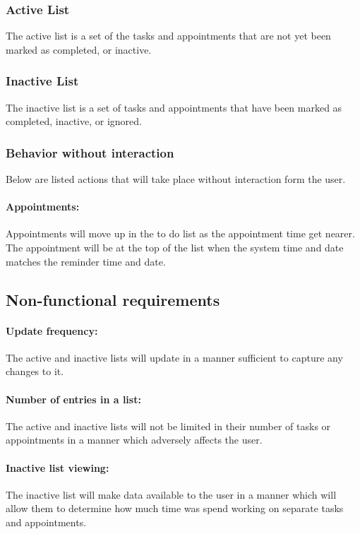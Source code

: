 \documentclass[12pt,a4paper]{article}
\begin{document}
\subsubsection{Active List}
The active list is a set of the tasks and appointments that are not yet been marked as completed, or inactive.

\subsubsection{Inactive List}
The inactive list is a set of tasks and appointments that have been marked as completed, inactive, or ignored. 

\subsubsection{Behavior without interaction}
Below are listed actions that will take place without interaction form the user.
\paragraph{Appointments:} Appointments will move up in the to do list as the appointment time get nearer.  The appointment will be at the top of the list when the system time and date matches the reminder time and date.

\subsection{Non-functional requirements}
\paragraph{Update frequency:} The active and inactive lists will update in a manner sufficient to capture any changes to it.
\paragraph{Number of entries in a list:} The active and inactive lists will not be limited in their number of tasks or appointments in a manner which adversely affects the user. 
\paragraph{Inactive list viewing:} The inactive list will make data available to the user in a manner which will allow them to determine how much time was spend working on separate tasks and appointments.
\end{document}
